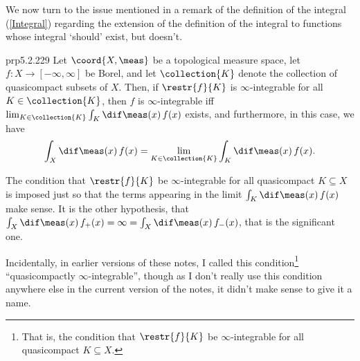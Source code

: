 We now turn to the issue mentioned in a remark of the definition of the integral (\cref{Integral}) regarding the extension of the definition of the integral to functions whose integral `should' exist, but doesn't.
\begin{thm}{}{prp5.2.229}
Let $\coord{X,\meas}$ be a topological measure space, let $f\colon X\rightarrow [-\infty ,\infty ]$ be Borel, and let $\collection{K}$ denote the collection of quasicompact subsets of $X$.  Then, if $\restr{f}{K}$ is $\infty$-integrable for all $K\in \collection{K}$, then $f$ is $\infty$-integrable iff $\lim _{K\in \collection{K}}\int _K\dif \meas (x)\, f(x)$ exists, and furthermore, in this case, we have
\begin{equation}
\int _X\dif \meas (x)\, f(x)=\lim _{K\in \collection{K}}\int _K\dif \meas (x)\, f(x).
\end{equation}
\begin{rmk}
The condition that $\restr{f}{K}$ be $\infty$-integrable for all quasicompact $K\subseteq X$ is imposed just so that the terms appearing in the limit $\int _K\dif \meas (x)\, f(x)$ make sense.  It is the other hypothesis, that $\int _X\dif \meas (x)\, f_+(x)=\infty =\int _X\dif \meas (x)\, f_-(x)$, that is the significant one.
\end{rmk}
\begin{rmk}
Incidentally, in earlier versions of these notes, I called this condition\footnote{That is, the condition that $\restr{f}{K}$ be $\infty$-integrable for all quasicompact $K\subseteq X$.} ``quasicompactly $\infty$-integrable'', though as I don't really use this condition anywhere else in the current version of the notes, it didn't make sense to give it a name.


\end{rmk}
\end{thm}
